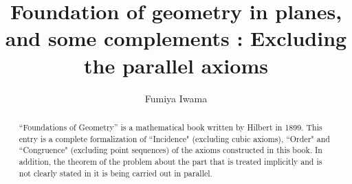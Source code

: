 \documentclass[11pt,a4paper]{article}
\begin{document}
\title{\bf Foundation of geometry in planes, and some complements : Excluding the parallel axioms}
\author{Fumiya Iwama}
\maketitle

\begin{abstract}
``Foundations of Geometry''\cite{1} is a mathematical book written by Hilbert in 1899.
This entry is a complete formalization of ``Incidence" (excluding cubic axioms), ``Order" and ``Congruence" (excluding point sequences) of the axioms constructed in this book.
In addition, the theorem of the problem about the part that is treated implicitly and is not clearly stated in it is being carried out in parallel.
\end{abstract}

\tableofcontents





\end{document}
